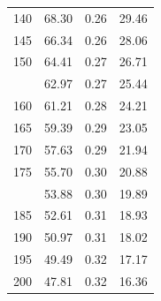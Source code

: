 \documentclass[12pt]{article}
\begin{document}
\begin{minipage}{0.5\textwidth}
\begin{tabular}{rccc}
    140 & 68.30 & 0.26 & 29.46 \\ 
    145 & 66.34 & 0.26 & 28.06 \\ 
    150 & 64.41 & 0.27 & 26.71 \\  \addlinespace
    155 & 62.97 & 0.27 & 25.44 \\ 
    160 & 61.21 & 0.28 & 24.21 \\ 
    165 & 59.39 & 0.29 & 23.05 \\ 
    170 & 57.63 & 0.29 & 21.94 \\ 
    175 & 55.70 & 0.30 & 20.88 \\  \addlinespace
    180 & 53.88 & 0.30 & 19.89 \\ 
    185 & 52.61 & 0.31 & 18.93 \\ 
    190 & 50.97 & 0.31 & 18.02 \\ 
    195 & 49.49 & 0.32 & 17.17 \\ 
    200 & 47.81 & 0.32 & 16.36 \\ 

\bottomrule
\end{tabular}

\end{minipage} \hfill
\end{document}
